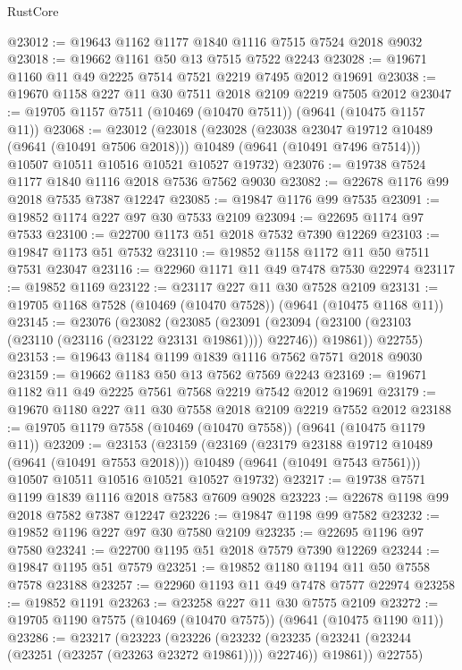 \begin{lexlean}{RustCore}
\begin{coremodule}
@23012 := @19643 @1162 @1177 @1840 @1116 @7515 @7524 @2018 @9032
@23018 := @19662 @1161 @50 @13 @7515 @7522 @2243
@23028 := @19671 @1160 @11 @49 @2225 @7514 @7521 @2219 @7495 @2012 @19691
@23038 := @19670 @1158 @227 @11 @30 @7511 @2018 @2109 @2219 @7505 @2012
@23047 := @19705 @1157 @7511 (@10469 (@10470 @7511)) (@9641 (@10475 @1157 @11))
@23068 := @23012
    (@23018
      (@23028
        (@23038 @23047 @19712 @10489 (@9641 (@10491 @7506 @2018)))
        @10489
        (@9641 (@10491 @7496 @7514)))
      @10507
      @10511
      @10516
      @10521
      @10527
      @19732)
@23076 := @19738 @7524 @1177 @1840 @1116 @2018 @7536 @7562 @9030
@23082 := @22678 @1176 @99 @2018 @7535 @7387 @12247
@23085 := @19847 @1176 @99 @7535
@23091 := @19852 @1174 @227 @97 @30 @7533 @2109
@23094 := @22695 @1174 @97 @7533
@23100 := @22700 @1173 @51 @2018 @7532 @7390 @12269
@23103 := @19847 @1173 @51 @7532
@23110 := @19852 @1158 @1172 @11 @50 @7511 @7531 @23047
@23116 := @22960 @1171 @11 @49 @7478 @7530 @22974
@23117 := @19852 @1169
@23122 := @23117 @227 @11 @30 @7528 @2109
@23131 := @19705 @1168 @7528 (@10469 (@10470 @7528)) (@9641 (@10475 @1168 @11))
@23145 := @23076
    (@23082
      (@23085
        (@23091 (@23094 (@23100 (@23103 (@23110 (@23116 (@23122 @23131 @19861)))) @22746)) @19861))
      @22755)
@23153 := @19643 @1184 @1199 @1839 @1116 @7562 @7571 @2018 @9030
@23159 := @19662 @1183 @50 @13 @7562 @7569 @2243
@23169 := @19671 @1182 @11 @49 @2225 @7561 @7568 @2219 @7542 @2012 @19691
@23179 := @19670 @1180 @227 @11 @30 @7558 @2018 @2109 @2219 @7552 @2012
@23188 := @19705 @1179 @7558 (@10469 (@10470 @7558)) (@9641 (@10475 @1179 @11))
@23209 := @23153
    (@23159
      (@23169
        (@23179 @23188 @19712 @10489 (@9641 (@10491 @7553 @2018)))
        @10489
        (@9641 (@10491 @7543 @7561)))
      @10507
      @10511
      @10516
      @10521
      @10527
      @19732)
@23217 := @19738 @7571 @1199 @1839 @1116 @2018 @7583 @7609 @9028
@23223 := @22678 @1198 @99 @2018 @7582 @7387 @12247
@23226 := @19847 @1198 @99 @7582
@23232 := @19852 @1196 @227 @97 @30 @7580 @2109
@23235 := @22695 @1196 @97 @7580
@23241 := @22700 @1195 @51 @2018 @7579 @7390 @12269
@23244 := @19847 @1195 @51 @7579
@23251 := @19852 @1180 @1194 @11 @50 @7558 @7578 @23188
@23257 := @22960 @1193 @11 @49 @7478 @7577 @22974
@23258 := @19852 @1191
@23263 := @23258 @227 @11 @30 @7575 @2109
@23272 := @19705 @1190 @7575 (@10469 (@10470 @7575)) (@9641 (@10475 @1190 @11))
@23286 := @23217
    (@23223
      (@23226
        (@23232 (@23235 (@23241 (@23244 (@23251 (@23257 (@23263 @23272 @19861)))) @22746)) @19861))
      @22755)

\end{coremodule}
\end{lexlean}
